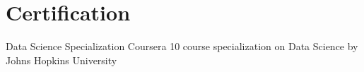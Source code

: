 \section{Certification}
  \resumeSubHeadingListStart
    \resumeSubheading
      {Data Science Specialization \href{https://github.com/benthecoder/JohnHopkinsDataScience}{}}{Coursera}
      {10 course specialization on Data Science by Johns Hopkins University}{} 
      \resumeItemListStart
    \resumeItemListEnd
  \resumeSubHeadingListEnd